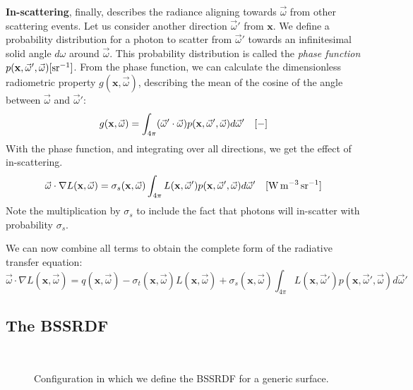 \textbf{In-scattering}, finally, describes the radiance aligning towards $\vec{\omega}$ from other scattering events. Let us consider another direction $\vec{\omega}'$ from $\mathbf{x}$. We define a probability distribution for a photon to scatter from $\vec{\omega}'$ towards an infinitesimal solid angle $d{\omega}$ around $\vec{\omega}$. This probability distribution is called the \emph{phase function}  $p(\mathbf{x}, \vec{\omega}', \vec{\omega}) \siunitnospace{ \per \steradian}$. From the phase function, we can calculate the dimensionless radiometric property $g(\mathbf{x}, \vec{\omega})$, describing the mean of the cosine of the angle between $\vec{\omega}$ and $\vec{\omega}'$:
\begin{equation*}
g(\mathbf{x}, \vec{\omega}) = \int_{4\pi} (\vec{\omega}' \cdot \vec{\omega}) p(\mathbf{x}, \vec{\omega}', \vec{\omega}) d\vec{\omega}'
\ \ \ [\SI{}{-}]
\end{equation*}
With the phase function, and integrating over all directions, we get the effect of in-scattering.
\begin{equation*}
\vec{\omega} \cdot \nabla L(\mathbf{x}, \vec{\omega}) = \sigma_s(\mathbf{x}, \vec{\omega}) \int_{4\pi} L(\mathbf{x}, \vec{\omega}')  p(\mathbf{x}, \vec{\omega}', \vec{\omega}) d \vec{\omega}'\siunit{\watt \per \cubic \metre \per \steradian}
\end{equation*}
Note the multiplication by $\sigma_s$ to include the fact that photons will in-scatter with probability $\sigma_s$. 

We can now combine all terms to obtain the complete form of the radiative transfer equation:
\begin{equation}
\label{eq:rte}
\vec{\omega} \cdot \nabla L(\mathbf{x}, \vec{\omega}) = q(\mathbf{x}, \vec{\omega}) - \sigma_t(\mathbf{x}, \vec{\omega}) L(\mathbf{x}, \vec{\omega}) + \sigma_s(\mathbf{x}, \vec{\omega}) \int_{4\pi} L(\mathbf{x}, \vec{\omega}')  p(\mathbf{x}, \vec{\omega}', \vec{\omega}) d \vec{\omega}'
\end{equation}

\subsection{The BSSRDF}
\begin{figure}
\centering
   \def\svgwidth{0.8\textwidth}
    \\
\caption{Configuration in which we define the BSSRDF for a generic surface.} %
\label{fig:bssrdf_configuration}
\end{figure}

